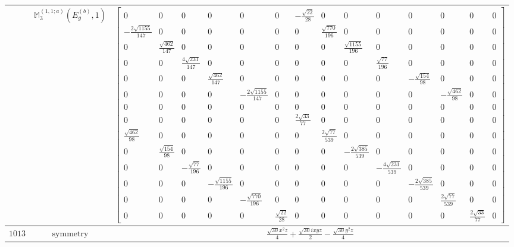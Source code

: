 \documentclass[fleqn,8pt,landscape]{jsarticle}
\begin{document}
\begin{longtable}{ccc}
$  $ & $ \mathbb{M}_{3}^{(1,1;a)}(E_{g}^{(b)},1) $ & $ \begin{bmatrix} 0 & 0 & 0 & 0 & 0 & 0 & - \frac{\sqrt{22}}{28} & 0 & 0 & 0 & 0 & 0 & 0 & 0 \\ - \frac{2 \sqrt{1155}}{147} & 0 & 0 & 0 & 0 & 0 & 0 & \frac{\sqrt{770}}{196} & 0 & 0 & 0 & 0 & 0 & 0 \\ 0 & \frac{\sqrt{462}}{147} & 0 & 0 & 0 & 0 & 0 & 0 & \frac{\sqrt{1155}}{196} & 0 & 0 & 0 & 0 & 0 \\ 0 & 0 & \frac{4 \sqrt{231}}{147} & 0 & 0 & 0 & 0 & 0 & 0 & \frac{\sqrt{77}}{196} & 0 & 0 & 0 & 0 \\ 0 & 0 & 0 & \frac{\sqrt{462}}{147} & 0 & 0 & 0 & 0 & 0 & 0 & - \frac{\sqrt{154}}{98} & 0 & 0 & 0 \\ 0 & 0 & 0 & 0 & - \frac{2 \sqrt{1155}}{147} & 0 & 0 & 0 & 0 & 0 & 0 & - \frac{\sqrt{462}}{98} & 0 & 0 \\ 0 & 0 & 0 & 0 & 0 & 0 & 0 & 0 & 0 & 0 & 0 & 0 & 0 & 0 \\ 0 & 0 & 0 & 0 & 0 & 0 & \frac{2 \sqrt{33}}{77} & 0 & 0 & 0 & 0 & 0 & 0 & 0 \\ \frac{\sqrt{462}}{98} & 0 & 0 & 0 & 0 & 0 & 0 & \frac{2 \sqrt{77}}{539} & 0 & 0 & 0 & 0 & 0 & 0 \\ 0 & \frac{\sqrt{154}}{98} & 0 & 0 & 0 & 0 & 0 & 0 & - \frac{2 \sqrt{385}}{539} & 0 & 0 & 0 & 0 & 0 \\ 0 & 0 & - \frac{\sqrt{77}}{196} & 0 & 0 & 0 & 0 & 0 & 0 & - \frac{4 \sqrt{231}}{539} & 0 & 0 & 0 & 0 \\ 0 & 0 & 0 & - \frac{\sqrt{1155}}{196} & 0 & 0 & 0 & 0 & 0 & 0 & - \frac{2 \sqrt{385}}{539} & 0 & 0 & 0 \\ 0 & 0 & 0 & 0 & - \frac{\sqrt{770}}{196} & 0 & 0 & 0 & 0 & 0 & 0 & \frac{2 \sqrt{77}}{539} & 0 & 0 \\ 0 & 0 & 0 & 0 & 0 & \frac{\sqrt{22}}{28} & 0 & 0 & 0 & 0 & 0 & 0 & \frac{2 \sqrt{33}}{77} & 0 \end{bmatrix} $ \\ \hline
$ 1013 $ & $ \text{symmetry} $ & $ \frac{\sqrt{30} x^{2} z}{4} + \frac{\sqrt{30} i x y z}{2} - \frac{\sqrt{30} y^{2} z}{4} $ \\

\end{longtable}
\end{document}
